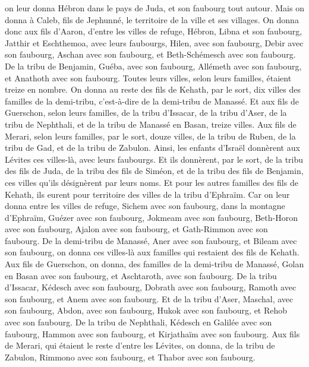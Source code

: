 \begin{multicols}{2}
on leur donna Hébron dans le pays de Juda, et son faubourg tout autour.
Mais on donna à Caleb, fils de Jephunné, le territoire de la ville et ses villages.
On donna donc aux fils d'Aaron, d'entre les villes de refuge, Hébron, Libna et son faubourg, Jatthir et Eschthemoa, avec leurs faubourgs,
Hilen, avec son faubourg, Debir avec son faubourg,
Aschan avec son faubourg, et Beth-Schémesch avec son faubourg.
De la tribu de Benjamin, Guéba, avec son faubourg, Allémeth avec son faubourg, et Anathoth avec son faubourg. Toutes leurs villes, selon leurs familles, étaient treize en nombre.
On donna au reste des fils de Kehath, par le sort, dix villes des familles de la demi-tribu, c'est-à-dire de la demi-tribu de Manassé.
Et aux fils de Guerschon, selon leurs familles, de la tribu d'Issacar, de la tribu d'Aser, de la tribu de Nephthali, et de la tribu de Manassé en Basan, treize villes.
Aux fils de Merari, selon leurs familles, par le sort, douze villes, de la tribu de Ruben, de la tribu de Gad, et de la tribu de Zabulon.
Ainsi, les enfants d'Israël donnèrent aux Lévites ces villes-là, avec leurs faubourgs.
Et ils donnèrent, par le sort, de la tribu des fils de Juda, de la tribu des fils de Siméon, et de la tribu des fils de Benjamin, ces villes qu'ils désignèrent par leurs noms.
Et pour les autres familles des fils de Kehath, ils eurent pour territoire des villes de la tribu d'Ephraïm.
Car on leur donna entre les villes de refuge, Sichem avec son faubourg, dans la montagne d'Ephraïm, Guézer avec son faubourg,
Jokmeam avec son faubourg, Beth-Horon avec son faubourg,
Ajalon avec son faubourg, et Gath-Rimmon avec son faubourg.
De la demi-tribu de Manassé, Aner avec son faubourg, et Bileam avec son faubourg, on donna ces villes-là aux familles qui restaient des fils de Kehath.
Aux fils de Guerschon, on donna, des familles de la demi-tribu de Manassé, Golan en Basan avec son faubourg, et Aschtaroth, avec son faubourg.
De la tribu d'Issacar, Kédesch avec son faubourg, Dobrath avec son faubourg,
Ramoth avec son faubourg, et Anem avec son faubourg.
Et de la tribu d'Aser, Maschal, avec son faubourg, Abdon, avec son faubourg,
Hukok avec son faubourg, et Rehob avec son faubourg.
De la tribu de Nephthali, Kédesch en Galilée avec son faubourg, Hammon avec son faubourg, et Kirjathaïm avec son faubourg.
Aux fils de Merari, qui étaient le reste d'entre les Lévites, on donna, de la tribu de Zabulon, Rimmono avec son faubourg, et Thabor avec son faubourg.

\end{multicols}

